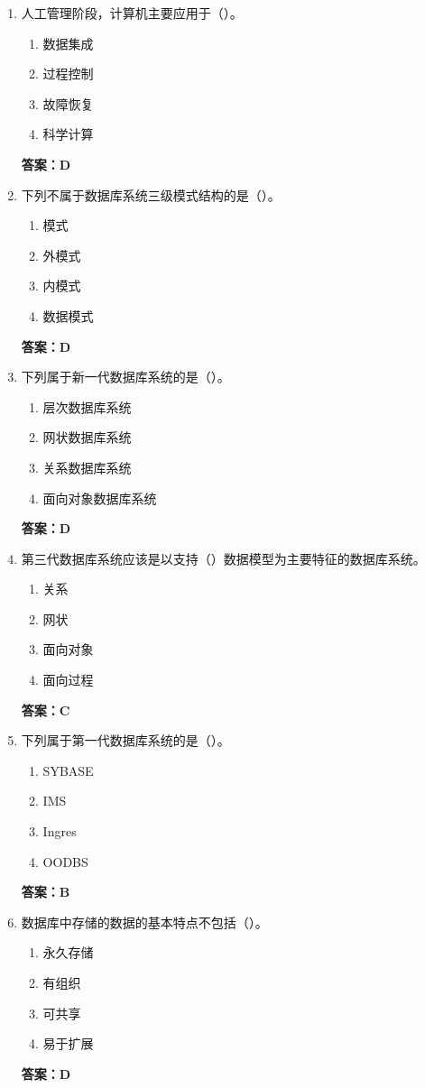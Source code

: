 \documentclass[12pt, a4paper]{article}
\begin{document}
\begin{enumerate}[label=\arabic*.]
	\item 人工管理阶段，计算机主要应用于（\quad）。
	      \begin{enumerate}
		      \item 数据集成
		      \item 过程控制
		      \item 故障恢复
		      \item 科学计算
	      \end{enumerate}
	      \textbf{答案：D}

	\item 下列不属于数据库系统三级模式结构的是（\quad）。
	      \begin{enumerate}
		      \item 模式
		      \item 外模式
		      \item 内模式
		      \item 数据模式
	      \end{enumerate}
	      \textbf{答案：D}

	\item 下列属于新一代数据库系统的是（\quad）。
	      \begin{enumerate}
		      \item 层次数据库系统
		      \item 网状数据库系统
		      \item 关系数据库系统
		      \item 面向对象数据库系统
	      \end{enumerate}
	      \textbf{答案：D}

	\item 第三代数据库系统应该是以支持（\quad）数据模型为主要特征的数据库系统。
	      \begin{enumerate}
		      \item 关系
		      \item 网状
		      \item 面向对象
		      \item 面向过程
	      \end{enumerate}
	      \textbf{答案：C}

	\item 下列属于第一代数据库系统的是（\quad）。
	      \begin{enumerate}
		      \item SYBASE
		      \item IMS
		      \item Ingres
		      \item OODBS
	      \end{enumerate}
	      \textbf{答案：B}

	\item 数据库中存储的数据的基本特点不包括（\quad）。
	      \begin{enumerate}
		      \item 永久存储
		      \item 有组织
		      \item 可共享
		      \item 易于扩展
	      \end{enumerate}
	      \textbf{答案：D}
\end{enumerate}
\end{document}
